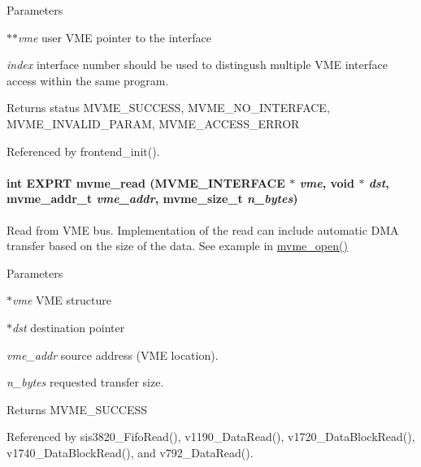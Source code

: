 \begin{DoxyParams}{Parameters}
\item[{\em $\ast$$\ast$vme}]user VME pointer to the interface \item[{\em index}]interface number should be used to distingush multiple VME interface access within the same program. \end{DoxyParams}
\begin{DoxyReturn}{Returns}
status MVME\_\-SUCCESS, MVME\_\-NO\_\-INTERFACE, MVME\_\-INVALID\_\-PARAM, MVME\_\-ACCESS\_\-ERROR 
\end{DoxyReturn}


Referenced by frontend\_\-init().
\paragraph[{mvme\_\-read}]{\setlength{\rightskip}{0pt plus 5cm}int EXPRT mvme\_\-read ({\bf MVME\_\-INTERFACE} $\ast$ {\em vme}, \/  void $\ast$ {\em dst}, \/  {\bf mvme\_\-addr\_\-t} {\em vme\_\-addr}, \/  {\bf mvme\_\-size\_\-t} {\em n\_\-bytes})}\hfill\label{group__mvmestdfunctionh_ga27a06319b3078fbabea16941721d7877}
Read from VME bus. Implementation of the read can include automatic DMA transfer based on the size of the data. See example in \hyperlink{group__mvmestdfunctionh_ga13db7fc7c7c022e46fadd8fc4dc40047}{mvme\_\-open()} 
\begin{DoxyParams}{Parameters}
\item[{\em $\ast$vme}]VME structure \item[{\em $\ast$dst}]destination pointer \item[{\em vme\_\-addr}]source address (VME location). \item[{\em n\_\-bytes}]requested transfer size. \end{DoxyParams}
\begin{DoxyReturn}{Returns}
MVME\_\-SUCCESS 
\end{DoxyReturn}


Referenced by sis3820\_\-FifoRead(), v1190\_\-DataRead(), v1720\_\-DataBlockRead(), v1740\_\-DataBlockRead(), and v792\_\-DataRead().
